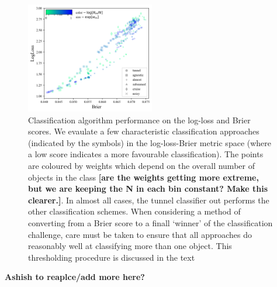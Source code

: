 \begin{figure}
	\begin{center}
		\includegraphics[width=0.5\textwidth]{./fig/all_effects_isolated.png}
		\caption{Classification algorithm performance on the log-loss and Brier scores. We evaulate a few characteristic classification approaches (indicated by the symbols) in the log-loss-Brier metric space (where a low score indicates a more favourable classification). The points are coloured by weights which depend on the overall number of objects in the class \textbf{[are the weights getting more extreme, but we are keeping the N in each bin constant? Make this clearer.]}. In almost all cases, the tunnel classifier out performs the other classification schemes. When considering a method of converting from a Brier score to a finall `winner' of the classification challenge, care must be taken to ensure that all approaches do reasonably well at classifying more than one object. This thresholding procedure is discussed in the text \label{fig:popweight}}
	\end{center}
\end{figure}

\textbf{Ashish to reaplce/add more here?}






